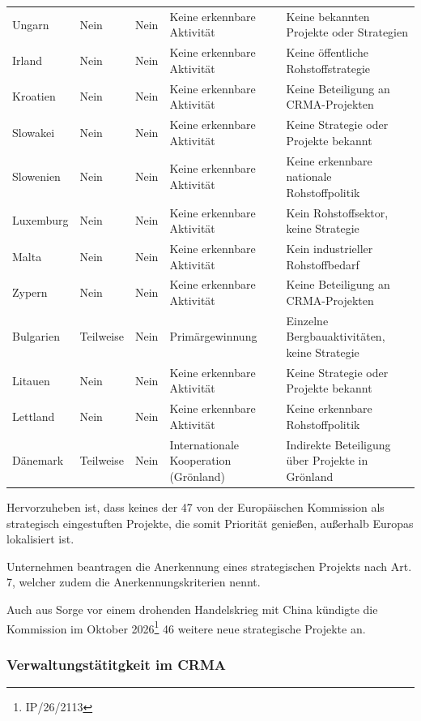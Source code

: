 \documentclass[12pt,a4paper,oneside]{book} %
\begin{document}
\begin{table}[htbp]
\begin{tabular}{|p{3cm}|p{2.5cm}|p{2.5cm}|p{4cm}|p{6cm}|}
		Ungarn & Nein & Nein & Keine erkennbare Aktivität & Keine bekannten Projekte oder Strategien \\
		Irland & Nein & Nein & Keine erkennbare Aktivität & Keine öffentliche Rohstoffstrategie \\
		Kroatien & Nein & Nein & Keine erkennbare Aktivität & Keine Beteiligung an CRMA-Projekten \\
		Slowakei & Nein & Nein & Keine erkennbare Aktivität & Keine Strategie oder Projekte bekannt \\
		Slowenien & Nein & Nein & Keine erkennbare Aktivität & Keine erkennbare nationale Rohstoffpolitik \\
		Luxemburg & Nein & Nein & Keine erkennbare Aktivität & Kein Rohstoffsektor, keine Strategie \\
		Malta & Nein & Nein & Keine erkennbare Aktivität & Kein industrieller Rohstoffbedarf \\
		Zypern & Nein & Nein & Keine erkennbare Aktivität & Keine Beteiligung an CRMA-Projekten \\
		Bulgarien & Teilweise & Nein & Primärgewinnung & Einzelne Bergbauaktivitäten, keine Strategie \\
		Litauen & Nein & Nein & Keine erkennbare Aktivität & Keine Strategie oder Projekte bekannt \\
		Lettland & Nein & Nein & Keine erkennbare Aktivität & Keine erkennbare Rohstoffpolitik \\
		Dänemark & Teilweise & Nein & Internationale Kooperation (Grönland) & Indirekte Beteiligung über Projekte in Grönland \\
		\hline
	\end{tabular}
	\label{tab:crma_umsetzung}
\end{table}


Hervorzuheben ist, dass keines der 47 von der Europäischen Kommission als strategisch eingestuften Projekte, die somit Priorität genießen, außerhalb Europas lokalisiert ist.

Unternehmen beantragen die Anerkennung eines strategischen Projekts nach Art. 7, welcher zudem die Anerkennungskriterien nennt.

Auch aus Sorge vor einem drohenden Handelskrieg mit China kündigte die Kommission im Oktober 2026\footnote{IP/26/2113} 46 weitere neue strategische Projekte an.\autocite{https://www.theguardian.com/world/2026/oct/09/eu-pulling-out-all-stops-with-minerals-projects-as-it-tries-to-avert-china-trade-war}

\subsubsection{Verwaltungstätitgkeit im CRMA}
\end{document}
